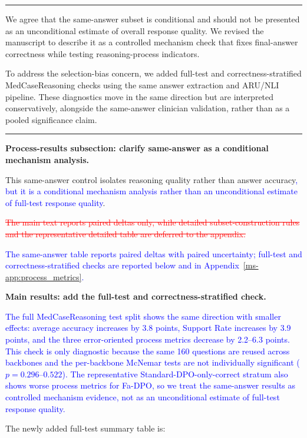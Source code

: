 \documentclass[12pt]{article}
\newcommand{\deleted}[1]{\textcolor{red}{\sout{#1}}}
\newcommand{\added}[1]{\textcolor{blue}{#1}}
\newcommand{\responseheading}[1]{%
    \vspace{0.24cm}
    \par\noindent{\large\bfseries #1}\par
    \vspace{0.03cm}
    \noindent\rule{\linewidth}{0.35pt}\par
    \vspace{0.06cm}
    \noindent\ignorespaces
}
\begin{document}
\responseheading{Response and Revision Summary}
We agree that the same-answer subset is conditional and should not be presented as an
unconditional estimate of overall response quality. We revised the manuscript to
describe it as a controlled mechanism check that fixes final-answer correctness while
testing reasoning-process indicators.

To address the selection-bias concern, we added full-test and correctness-stratified
MedCaseReasoning checks using the same answer extraction and ARU/NLI pipeline. These
diagnostics move in the same direction but are interpreted conservatively, alongside
the same-answer clinician validation, rather than as a pooled significance claim.


\responseheading{Revision Details}
\textbf{Process-results subsection: clarify same-answer as a conditional
mechanism analysis.}
\begin{displayquote}
This same-answer control isolates reasoning quality rather than answer
accuracy\added{, but it is a conditional mechanism analysis rather than an
unconditional estimate of full-test response quality}.

\deleted{The main text reports paired deltas only, while detailed subset-construction rules and the representative detailed table are deferred to the appendix.}

\added{The same-answer table reports paired deltas with paired uncertainty; full-test and correctness-stratified checks are reported below and in Appendix~\ref*{ms-app:process_metrics}.}
\end{displayquote}

\textbf{Main results: add the full-test and correctness-stratified check.}
\begin{displayquote}
\added{The full MedCaseReasoning test split shows the same direction with smaller effects: average accuracy increases by 3.8 points, Support Rate increases by 3.9 points, and the three error-oriented process metrics decrease by 2.2--6.3 points. This check is only diagnostic because the same 160 questions are reused across backbones and the per-backbone McNemar tests are not individually significant ($p=0.296$--$0.522$). The representative Standard-DPO-only-correct stratum also shows worse process metrics for Fa-DPO, so we treat the same-answer results as controlled mechanism evidence, not as an unconditional estimate of full-test response quality.}
\end{displayquote}

\noindent The newly added full-test summary table is:
\end{document}
